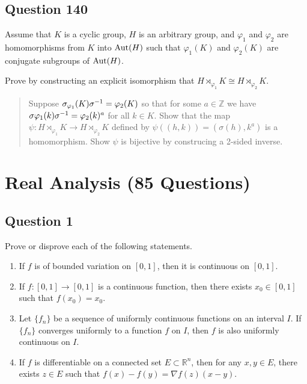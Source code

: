 \documentclass[12pt]{article}
\begin{document}
\hypertarget{question-140}{%
\subsection{Question 140}\label{question-140}}

Assume that \(K\) is a cyclic group, \(H\) is an arbitrary group, and
\(\varphi_1\) and \(\varphi_2\) are homomorphisms from \(K\) into
\({\text{Aut}}(H)\) such that \(\varphi_1(K)\) and \(\varphi_2(K)\) are
conjugate subgroups of \({\text{Aut}}(H)\).

Prove by constructing an explicit isomorphism that
\(H\rtimes_{\varphi_1}K\cong H\rtimes_{\varphi_2} K\).

\begin{quote}
Suppose \(\sigma_{\varphi_1}(K)\sigma^{-1}=\varphi_2(K)\) so that for
some \(a\in\mathbb Z\) we have
\(\sigma\varphi_1(k)\sigma^{-1} =\varphi_2(k)^a\) for all \(k\in K\).
Show that the map
\(\psi:H \rtimes_{\varphi_1}K\rightarrow H\rtimes_{\varphi_2}K\) defined
by \(\psi((h,k))=(\sigma(h),k^a)\) is a homomorphism. Show \(\psi\) is
bijective by construcing a 2-sided inverse.
\end{quote}

\hypertarget{real-analysis-85-questions}{%
\section{Real Analysis (85
Questions)}\label{real-analysis-85-questions}}

\hypertarget{question-1-1}{%
\subsection{Question 1}\label{question-1-1}}

Prove or disprove each of the following statements.

\begin{enumerate}
\def\labelenumi{(\alph{enumi})}
\item
  If \(f\) is of bounded variation on \([0,1]\), then it is continuous
  on \([0,1]\).
\item
  If \(f : [0, 1] \to [0, 1]\) is a continuous function, then there
  exists \(x_0 \in [0, 1]\) such that \(f(x_0) = x_0\).
\item
  Let \(\{f_n\}\) be a sequence of uniformly continuous functions on an
  interval \(I\). If \(\{f_n\}\) converges uniformly to a function \(f\)
  on \(I\), then \(f\) is also uniformly continuous on \(I\).
\item
  If \(f\) is differentiable on a connected set
  \(E \subset \mathbb{R}^n\), then for any \(x, y \in E\), there exists
  \(z \in E\) such that \(f(x) - f(y) = \nabla f(z)(x - y)\).
\end{enumerate}
\end{document}
